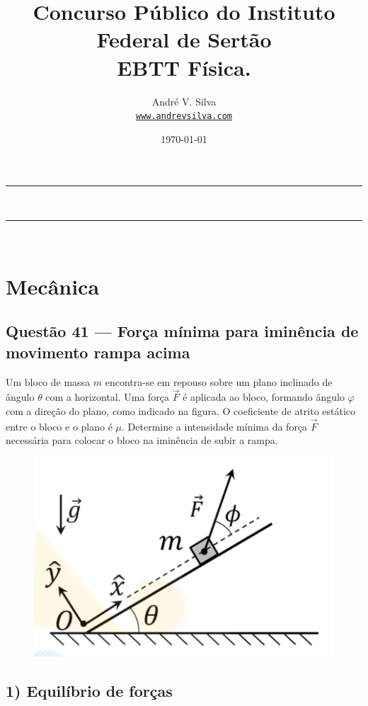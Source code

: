 \documentclass[a4paper,12pt]{article}
\title{Concurso Público do Instituto Federal de Sert\~ao  \\ 
EBTT \textbf{\large F\'isica}.}
\author{Andr\'e V. Silva \\ \texttt{\url{www.andrevsilva.com}}}
\date{\today}
\begin{document}
\maketitle

\tableofcontents

\noindent\rule{\linewidth}{0.4pt}\\
\newpage
\justifying

\noindent\rule{\linewidth}{0.4pt}\\
\section{Mec\^anica}
\begin{flushleft}
\subsection{Quest\~ao 41 — Força mínima para imin\^encia de movimento rampa acima}

Um bloco de massa $m$ encontra-se em repouso sobre um plano inclinado de ângulo
$\theta$ com a horizontal. Uma força $\vec{F}$ é aplicada ao bloco, formando ângulo
$\varphi$ com a direção do plano, como indicado na figura. O coeficiente de atrito
estático entre o bloco e o plano é $\mu$. Determine a intensidade mínima da força
$\vec{F}$ necessária para colocar o bloco na iminência de subir a rampa.

\begin{figure}[!h]
  \centering
  \includegraphics[scale=0.5]{figures/forca_minima.png}
\end{figure}

\subsection*{1) Equilíbrio de forças}


\end{flushleft}
\end{document}
